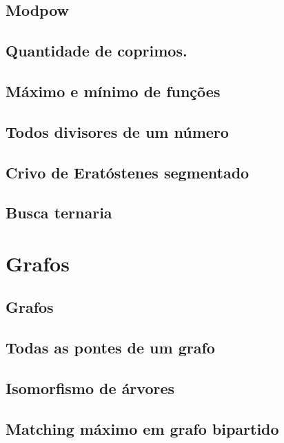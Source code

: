 \subsection{Modpow}
\raggedbottom
\hrulefill
\subsection{Quantidade de coprimos.}
\raggedbottom
\hrulefill
\subsection{Máximo e mínimo de funções}
\raggedbottom
\hrulefill
\subsection{Todos divisores de um número}
\raggedbottom
\hrulefill
\subsection{Crivo de Eratóstenes segmentado}
\raggedbottom
\hrulefill
\subsection{Busca ternaria}
\raggedbottom
\hrulefill
\clearpage
\section{Grafos}
\subsection{Grafos}
\raggedbottom
\hrulefill
\subsection{Todas as pontes de um grafo}
\raggedbottom
\hrulefill
\subsection{Isomorfismo de árvores}
\raggedbottom
\hrulefill
\subsection{Matching máximo em grafo bipartido}
\raggedbottom
\hrulefill
